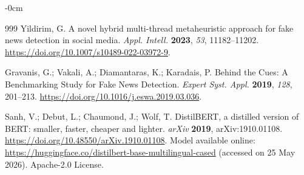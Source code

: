 \documentclass[informatics,article,submit,pdftex,moreauthors]{Definitions/mdpi}
\begin{document}
\begin{adjustwidth}{-\extralength}{0cm}
\begin{thebibliography}{999}
Yildirim, G. A novel hybrid multi-thread metaheuristic approach for fake news detection in social media. \textit{Appl. Intell.} \textbf{2023}, \textit{53}, 11182--11202. \href{https://doi.org/10.1007/s10489-022-03972-9}{https://doi.org/10.1007/s10489-022-03972-9}.
 
Gravanis, G.; Vakali, A.; Diamantaras, K.; Karadais, P. Behind the Cues: A Benchmarking Study for Fake News Detection. \textit{Expert Syst. Appl.} \textbf{2019}, \textit{128}, 201--213. \href{https://doi.org/10.1016/j.eswa.2019.03.036}{https://doi.org/10.1016/j.eswa.2019.03.036}.
 
Sanh, V.; Debut, L.; Chaumond, J.; Wolf, T. DistilBERT, a distilled version of BERT: smaller, faster, cheaper and lighter. \textit{arXiv} \textbf{2019}, arXiv:1910.01108. \href{https://doi.org/10.48550/arXiv.1910.01108}{https://doi.org/10.48550/arXiv.1910.01108}. Model available online: \url{https://huggingface.co/distilbert-base-multilingual-cased} (accessed on 25 May 2026). Apache-2.0 License.

\end{thebibliography}

\end{adjustwidth}
\end{document}

